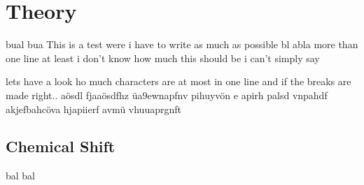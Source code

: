 \section{Theory}
bual bua This is a test were i have to write as much as possible bl abla more than one line at least i don't know how much this should be i can't simply say 

lets have a look ho much characters are at most in one line and if the breaks are made right.. aösdl fjaaösdfhz üa9ewnapfnv pihuyvön e apirh palsd vnpahdf akjefbahcöva hjapiierf avmü vhuuaprgnft 

\subsection{Chemical Shift}
bal bal 
